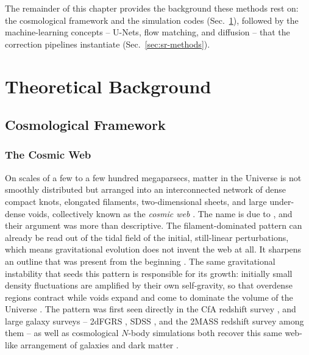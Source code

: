 \documentclass{report}
\begin{document}
The remainder of this chapter provides the background these methods rest on: the cosmological framework and the simulation codes (Sec.~\ref{sec:theoretical-background}), followed by the machine-learning concepts -- U-Nets, flow matching, and diffusion -- that the correction pipelines instantiate (Sec.~\ref{sec:sr-methods}).


\section{Theoretical Background}
\label{sec:theoretical-background}
\subsection{Cosmological Framework}
\subsubsection{The Cosmic Web}
\label{sec:cosmic_web}

On scales of a few to a few hundred megaparsecs, matter in the Universe is not smoothly distributed but arranged into an interconnected network of dense compact knots, elongated filaments, two-dimensional sheets, and large under-dense voids, collectively known as the \emph{cosmic web} \cite{bond_how_1996, libeskind_tracing_2018}. The name is due to \citeauthor{bond_how_1996}, and their argument was more than descriptive. The filament-dominated pattern can already be read out of the tidal field of the initial, still-linear perturbations, which means gravitational evolution does not invent the web at all. It sharpens an outline that was present from the beginning \cite{bond_how_1996}. The same gravitational instability that seeds this pattern is responsible for its growth: initially small density fluctuations are amplified by their own self-gravity, so that overdense regions contract while voids expand and come to dominate the volume of the Universe \cite{bond_how_1996}. The pattern was first seen directly in the CfA redshift survey \cite{de_lapparent_slice_1986}, and large galaxy surveys -- 2dFGRS \cite{colless_2df_2001}, SDSS \cite{york_sloan_2000}, and the 2MASS \cite{huchra_2mass_2012} redshift survey among them -- as well as cosmological $N$-body simulations both recover this same web-like arrangement of galaxies and dark matter \cite{libeskind_tracing_2018}.
\end{document}
